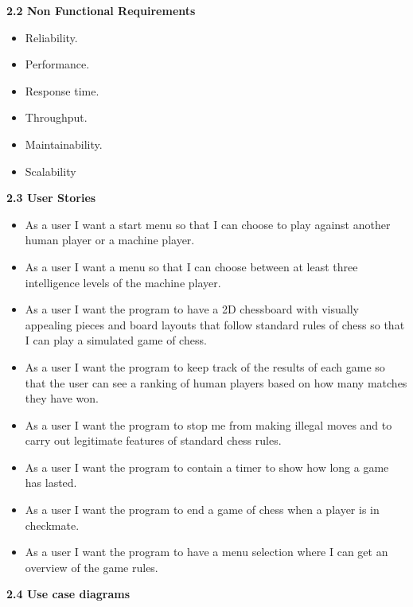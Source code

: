 \documentclass{article}
\begin{document}
\begin{flushleft}
\newpage

\textbf{2.2	Non Functional Requirements}
\begin{itemize}
	\item Reliability.
	\item Performance.
	\item Response time.
	\item Throughput.
	\item Maintainability.
	\item Scalability
\end{itemize}

\vspace{5mm}
\textbf{2.3	User Stories}\\
	\begin{itemize}
	
	\item As a user I want a start menu so that I can choose to play against another human player or a machine player.
	\item As a user I want a menu so that I can choose between at least three intelligence levels of the machine player.
	\item As a user I want the program to have a 2D chessboard with visually appealing pieces and board layouts that follow standard rules of chess so that I can play a simulated game of chess.
	\item As a user I want the program to keep track of the results of each game so that the user can see a ranking of human players based on how many matches they have won.

	\item As a user I want the program to stop me from making illegal moves and to carry out legitimate features of standard chess rules.
	\item As a user I want the program to contain a timer to show how long a game has lasted.
	\item As a user I want the program to end a game of chess when a player is in checkmate.
	\item As a user I want the program to have a menu selection where I can get an overview of the game rules.
	\end{itemize}
\vspace{5mm}

\newpage

\textbf{2.4	Use case diagrams}\\

\end{flushleft}
\end{document}
